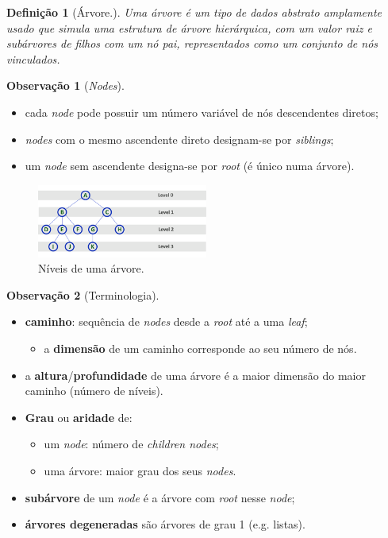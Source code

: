 \documentclass[a4paper, 12pt]{article}
\newtheorem{definition}{Definição}[section]
\newtheorem{remark}{Observação}
\begin{document}
\begin{definition}[Árvore.]
    Uma árvore é um tipo de dados abstrato amplamente usado que simula uma estrutura de árvore hierárquica, com um valor raiz e subárvores de filhos com um nó pai, representados como um conjunto de nós vinculados.
\end{definition}

\begin{remark}[\emph{Nodes}]\end{remark}

    \begin{itemize}
        \item cada \emph{node} pode possuir um número variável de nós descendentes diretos;
        \item \emph{nodes} com o mesmo ascendente direto designam-se por \emph{siblings};
        \item um \emph{node} sem ascendente designa-se por \emph{root} (é único numa árvore).
    \end{itemize}
    \begin{center}
        \begin{figure}[h]
            \centering
            \includegraphics[width=0.5\textwidth]{fig/t/tlevels.png}
            \caption{Níveis de uma árvore.}
        \end{figure}
    \end{center}


\begin{remark}[Terminologia]\end{remark}
    \begin{itemize}
        \item \textbf{caminho}: sequência de \emph{nodes} desde a \emph{root} até a uma \emph{leaf};
        \begin{itemize}
            \item a \textbf{dimensão} de um caminho corresponde ao seu número de nós.
        \end{itemize}
        \item a \textbf{altura}/\textbf{profundidade} de uma árvore é a maior dimensão do maior caminho (número de níveis).
        \item \textbf{Grau} ou \textbf{aridade} de:
        \begin{itemize}
            \item um \emph{node}: número de \emph{children nodes};
            \item uma árvore: maior grau dos seus \emph{nodes}.
        \end{itemize}
        \item \textbf{subárvore} de um \emph{node} é a árvore com \emph{root} nesse \emph{node};
        \item \textbf{árvores degeneradas} são árvores de grau 1 (e.g. listas).
    \end{itemize}
\end{document}
